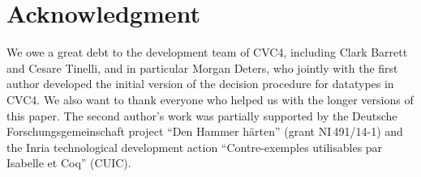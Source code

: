 \documentclass[letter]{article}
\theoremstyle{definition}
\begin{document}
\section*{Acknowledgment}

We owe a great debt to the development team of CVC4, including Clark Barrett
and Cesare Tinelli, and in particular Morgan Deters, who jointly with the
first author developed the initial version of the decision procedure for
datatypes in CVC4.
We also want to thank everyone who helped us with the longer versions of
this paper.
The second author's work was partially supported by
the Deutsche
Forschungs\-gemein\-schaft %
project ``Den Hammer h\"arten'' (grant NI\,491\slash 14-1)
and the Inria technological development
action ``Contre-exemples utilisables par Isabelle et Coq'' (CUIC).

\raggedright


{}
\end{document}
